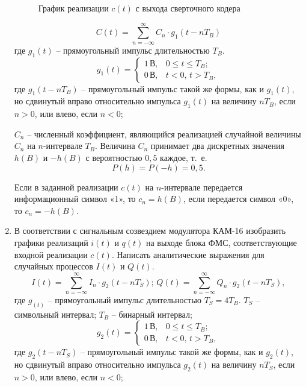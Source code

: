 \documentclass[a4paper, 12pt]{article}
\begin{document}
\begin{enumerate}
\begin{figure}[H]
    \caption{График реализации $c(t)$ с выхода сверточного кодера}
  \end{figure}

  \[ C(t)=\sum^\infty_{n=-\infty}C_n\cdot g_1(t-nT_B) \]
  где $g_1(t)$ -- прямоугольный импульс длительностью $T_B$.
  \[ g_1(t)=\begin{cases}
    1\,В, & 0\leq t \leq T_B;\\
    0\,В, & t<0,\,t>T_B,
  \end{cases} \]
  где $g_1(t-nT_B)$ -- прямоугольный импульс такой же формы, 
  как и $g_1(t)$, но сдвинутый вправо относительно импульса 
  $g_1(t)$ на величину $nT_B$, если $n>0$, или 
  влево, если $n<0$; 
  
  $C_n$ -- численный коэффициент, являющийся реализацией 
  случайной величины $C_n$ на $n$-интервале $T_B$.
  Величина $C_n$ принимает два дискретных значения $h(B)$ и 
  $-h(B)$ с вероятностью $0,5$ каждое, \mbox{т. е.} 
  \[ P(h)=P(-h)=0,5. \]

  Если в заданной реализации $c(t)$ на $n$-интервале передается 
  информационный символ «1», то $c_n=h(B)$, 
  если передается символ «0», то $c_n=-h(B)$.

  \item В соответствии с сигнальным созвездием модулятора КАМ-16 
  изобразить графики реализаций $i(t)$ и $q(t)$ на выходе 
  блока ФМС, соответствующие входной реализации $c(t)$. 
  Написать аналитические выражения для случайных процессов 
  $I(t)$ и $Q(t)$.
  \begin{equation} \label{eq:ItQt}
  I(t)=\sum^\infty_{n=-\infty}I_n\cdot g_2(t-nT_S);\,
  Q(t)=\sum^\infty_{n=-\infty}Q_n\cdot g_2(t-nT_S),
  \end{equation}
  где $g_(t)$ -- прямоугольный импульс длительностью 
  $T_S=4T_B$. $T_S$ -- символьный интервал; 
  $T_B$ -- бинарный интервал;
  \[ g_2(t)=\begin{cases}
    1\,В, & 0\leq t \leq T_B;\\
    0\,В, & t<0,\,t>T_B,
  \end{cases} \]
  где $g_2(t-nT_S)$ -- прямоугольный импульс такой же формы, 
  как и $g_2(t)$, но сдвинутый вправо относительно импульса 
  $g_2(t)$ на величину $nT_S$, если $n>0$, или 
  влево, если $n<0$;
  

\end{enumerate}
\end{document}

